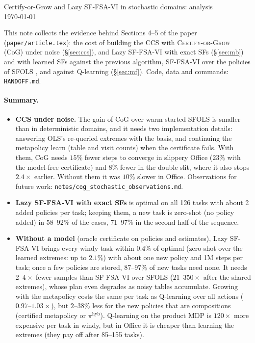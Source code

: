 \documentclass[11pt]{article}
\begin{document}
\begin{center}
{\Large Certify-or-Grow and Lazy SF-FSA-VI in stochastic domains: analysis}\\[2pt]
{\small \today}
\end{center}

\noindent This note collects the evidence behind Sections 4--5 of the paper (\texttt{paper/article.tex}): the cost of
building the CCS with \textsc{Certify-or-Grow} (CoG) under noise (\S\ref{sec:ccs}), and Lazy SF-FSA-VI with exact SFs
(\S\ref{sec:mb}) and with learned SFs against the previous algorithm, SF-FSA-VI over the policies of SFOLS
\cite{kuric}, and against Q-learning (\S\ref{sec:mf}). Code, data and commands: \texttt{HANDOFF.md}.

\paragraph{Summary.}
\begin{itemize}\setlength\itemsep{1pt}
\item \textbf{CCS under noise.} The gain of CoG over warm-started SFOLS is smaller than in deterministic domains, and
it needs two implementation details: answering OLS's re-queried extremes with the basis, and continuing the metapolicy
learn (table and visit counts) when the certificate fails. With them, CoG needs $15\%$ fewer steps to converge in
slippery Office ($23\%$ with the model-free certificate) and $8\%$ fewer in the double slit, where it also stops
$2.4\times$ earlier. Without them it was $10\%$ slower in Office. Observations for future work:
\texttt{notes/cog\_stochastic\_observations.md}.
\item \textbf{Lazy SF-FSA-VI with exact SFs} is optimal on all 126 tasks with about 2 added policies per task; keeping
them, a new task is zero-shot (no policy added) in 58--92\% of the cases, 71--97\% in the second half of the sequence.
\item \textbf{Without a model} (oracle certificate on policies and estimates), Lazy SF-FSA-VI brings every windy task
within $0.4\%$ of optimal (zero-shot over the learned extremes: up to $2.1\%$) with about one new policy and 1M steps per
task; once a few policies are stored, 87--97\% of new tasks need none. It needs $2$--$4\times$ fewer samples than
SF-FSA-VI over SFOLS ($21$--$350\times$ after the shared extremes), whose plan even degrades as noisy tables accumulate.
Growing with the metapolicy costs the same per task as Q-learning over all actions ($0.97$--$1.03\times$), but
$2$--$38\%$ less for the new policies that are compositions (certified metapolicy or $\pi^{\mathrm{hyb}}$). Q-learning on the product MDP is $120\times$
more expensive per task in windy, but in Office it is cheaper than learning the extremes (they pay off after 85--155
tasks).
\end{itemize}
\end{document}
